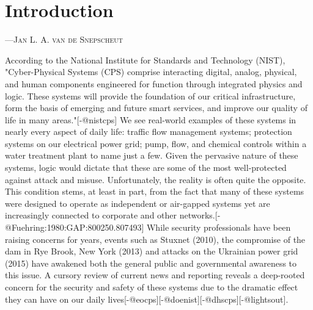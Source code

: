 \setcounter{page}{1}    %

\chapter{Introduction}

\bigskip
\setlength{\epigraphwidth}{.6\textwidth}
\begin{epigraphs}
	{---\textsc{Jan L. A. van de Snepscheut}}
	\centering
\end{epigraphs}
\bigskip

According to the National Institute for Standards and Technology (NIST), "Cyber-Physical Systems (CPS) comprise interacting digital, analog, physical, and human components engineered for function through integrated physics and logic. These systems will provide the foundation of our critical infrastructure, form the basis of emerging and future smart services, and improve our quality of life in many areas."[-@nistcps] We see real-world examples of these systems in nearly every aspect of daily life: traffic flow management systems; protection systems on our electrical power grid; pump, flow, and chemical controls within a water treatment plant to name just a few. Given the pervasive nature of these systems, logic would dictate that these are some of the most well-protected against attack and misuse. Unfortunately, the reality is often quite the opposite. This condition stems, at least in part, from the fact that many of these systems were designed to operate as independent or air-gapped systems yet are increasingly connected to corporate and other networks.[-@Fuehring:1980:GAP:800250.807493] While security professionals have been raising concerns for years, events such as Stuxnet (2010), the compromise of the dam in Rye Brook, New York (2013) and attacks on the Ukrainian power grid (2015) have awakened both the general public and governmental awareness to this issue. A cursory review of current news and reporting reveals a deep-rooted concern for the security and safety of these systems due to the dramatic effect they can have on our daily lives[-@eocps][-@doenist][-@dhscps][-@lightsout].

